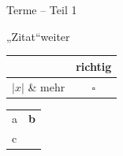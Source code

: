 \documentclass[lang=ngerman]{edoxarticle}
\begin{document}
\pdate{}
\begin{worksheet}[nosolution]{Terme -- Teil 1}

„Zitat“\quad{}weiter

\begin{tabular}{|p{3cm}|c|}
\hline
 & richtig\\
\hline
$|x|$ \& mehr & $\square$\\
\hline
\end{tabular}

\begin{center}
\begin{tabular}{@{}lr@{}}
a & \textbf{b}\\[4pt]
c & 
\end{tabular}
\end{center}


\end{worksheet}
\end{document}
